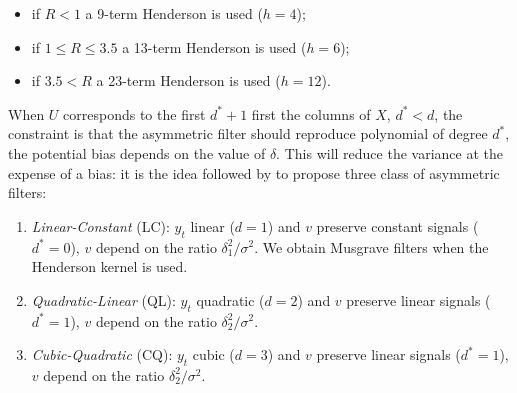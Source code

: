 \documentclass[
  12pt,
  ,
  a4paper]{article}
\newcommand\1{\mathds{1}}
\begin{document}
\begin{itemize}
\item
  if \(R<1\) a 9-term Henderson is used (\(h=4\));
\item
  if \(1\leq R\leq3.5\) a 13-term Henderson is used (\(h=6\));
\item
  if \(3.5< R\) a 23-term Henderson is used (\(h=12\)).
\end{itemize}

When \(U\) corresponds to the first \(d^*+1\) first the columns of \(X\), \(d^*<d\), the constraint is that the asymmetric filter should reproduce polynomial of degree \(d^*\), the potential bias depends on the value of \(\delta\).
This will reduce the variance at the expense of a bias: it is the idea followed by \textcite{proietti2008} to propose three class of asymmetric filters:

\begin{enumerate}
\def\labelenumi{\arabic{enumi}.}
\item
  \emph{Linear-Constant} (LC): \(y_t\) linear (\(d=1\)) and \(v\) preserve constant signals (\(d^*=0\)), \(v\) depend on the ratio \(\delta_1^2/\sigma^2\). We obtain Musgrave filters when the Henderson kernel is used.
\item
  \emph{Quadratic-Linear} (QL): \(y_t\) quadratic (\(d=2\)) and \(v\) preserve linear signals (\(d^*=1\)), \(v\) depend on the ratio \(\delta_2^2/\sigma^2\).
\item
  \emph{Cubic-Quadratic} (CQ): \(y_t\) cubic (\(d=3\)) and \(v\) preserve linear signals (\(d^*=1\)), \(v\) depend on the ratio \(\delta_2^2/\sigma^2\).
\end{enumerate}
\end{document}

